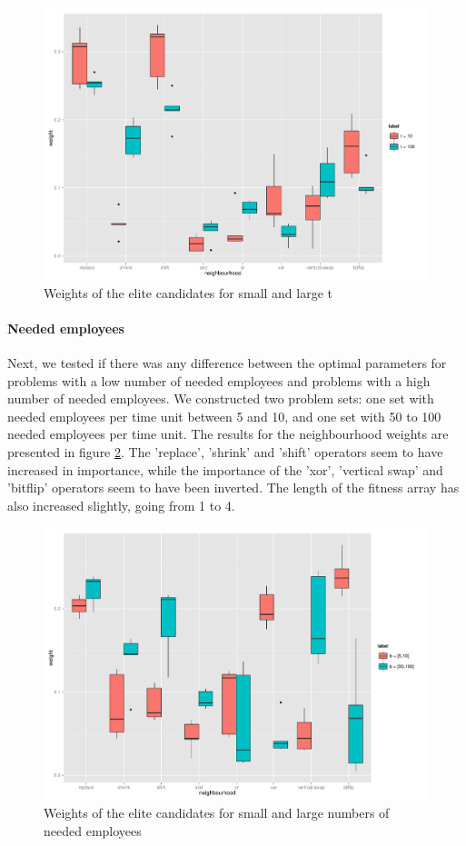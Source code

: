 \documentclass[]{article}
\begin{document}
\begin{figure}
	\includegraphics[width=\textwidth]{boxplot_t.pdf}
	\caption{Weights of the elite candidates for small and large t}
	\label{fig:t}
\end{figure}

\paragraph{Needed employees}
Next, we tested if there was any difference between the optimal parameters for problems with a low number of needed employees and problems with a high number of needed employees.
We constructed two problem sets: one set with needed employees per time unit between 5 and 10, and one set with 50 to 100 needed employees per time unit. The results for the neighbourhood weights are presented in figure \ref{fig:b}. The 'replace', 'shrink' and 'shift' operators seem to have increased in importance, while the importance of the 'xor', 'vertical swap' and 'bitflip' operators seem to have been inverted. The length of the fitness array has also increased slightly, going from 1 to 4.

\begin{figure}
	\includegraphics[width=\textwidth]{boxplot_b.pdf}
	\caption{Weights of the elite candidates for small and large numbers of needed employees}
	\label{fig:b}
\end{figure}
\end{document}
